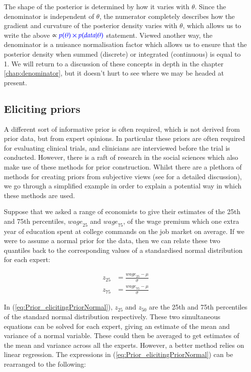 \documentclass[11pt,fullpage]{book}
\begin{document}
The shape of the posterior is determined by how it varies with $\theta$. Since the denominator is independent of $\theta$, the numerator completely describes how the gradient and curvature of the posterior density varies with $\theta$, which allows us to write the above  $ \propto {\color{blue}p(\theta)\times p(data|\theta)}$ statement. Viewed another way, the denominator is a nuisance normalisation factor which allows us to ensure that the posterior density when summed (discrete) or integrated (continuous) is equal to 1. We will return to a discussion of these concepts in depth in the chapter \ref{chap:denominator}, but it doesn't hurt to see where we may be headed at present.


\subsection{Eliciting priors}
A different sort of informative prior is often required, which is not derived from prior data, but from expert opinions. In particular these priors are often required for evaluating clinical trials, and clinicians are interviewed before the trial is conducted. However, there is a raft of research in the social sciences which also make use of these methods for prior construction. Whilst there are a plethora of methods for creating priors from subjective views (see \cite{gill2007bayesian} for a detailed discussion), we go through a simplified example in order to explain a potential way in which these methods are used. 

Suppose that we asked a range of economists to give their estimates of the 25th and 75th percentiles, ${wage}_{25}$ and ${wage}_{75}$, of the wage premium which one extra year of education spent at college commands on the job market on average. If we were to assume a normal prior for the data, then we can relate these two quantiles back to the corresponding values of a standardised normal distribution for each expert:

\begin{equation}\label{eq:Prior_elicitingPriorNormal}
\begin{align}
z_{25} &= \frac{{wage}_{25} - \mu}{\sigma}\\
z_{75} &= \frac{{wage}_{75} - \mu}{\sigma}
\end{align}
\end{equation}

In (\ref{eq:Prior_elicitingPriorNormal}), $z_{25}$ and $z_{50}$ are the 25th and 75th percentiles of the standard normal distribution respectively. These two simultaneous equations can be solved for each expert, giving an estimate of the mean and variance of a normal variable. These could then be averaged to get estimates of the mean and variance across all the experts. However, a better method relies on linear regression. The expressions in (\ref{eq:Prior_elicitingPriorNormal}) can be rearranged to the following:
\end{document}
